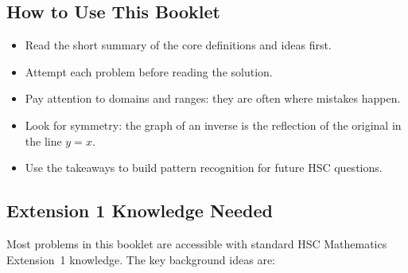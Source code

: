 \documentclass[12pt]{article}
\theoremstyle{definition}
\begin{document}
\subsection{How to Use This Booklet}
\begin{itemize}[leftmargin=*]
  \item Read the short summary of the core definitions and ideas first.
  \item Attempt each problem before reading the solution.
  \item Pay attention to domains and ranges: they are often where mistakes happen.
  \item Look for symmetry: the graph of an inverse is the reflection of the original in the line $y=x$.
  \item Use the takeaways to build pattern recognition for future HSC questions.
\end{itemize}

\subsection{Extension 1 Knowledge Needed}
Most problems in this booklet are accessible with standard HSC Mathematics Extension~1 knowledge. The key background ideas are:
\end{document}
